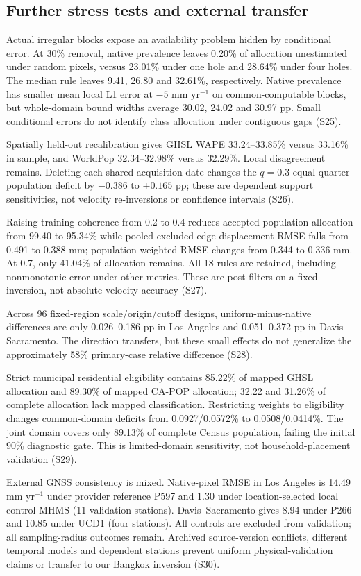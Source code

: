 \subsection{Further stress tests and external transfer}
Actual irregular blocks expose an availability problem hidden by conditional error. At 30\% removal, native prevalence leaves 0.20\% of allocation unestimated under random pixels, versus 23.01\% under one hole and 28.64\% under four holes. The median rule leaves 9.41, 26.80 and 32.61\%, respectively. Native prevalence has smaller mean local L1 error at $-5$ mm yr$^{-1}$ on common-computable blocks, but whole-domain bound widths average 30.02, 24.02 and 30.97 pp. Small conditional errors do not identify class allocation under contiguous gaps (S25).

Spatially held-out recalibration gives GHSL WAPE 33.24--33.85\% versus 33.16\% in sample, and WorldPop 32.34--32.98\% versus 32.29\%. Local disagreement remains. Deleting each shared acquisition date changes the $q=0.3$ equal-quarter population deficit by $-0.386$ to $+0.165$ pp; these are dependent support sensitivities, not velocity re-inversions or confidence intervals (S26).

Raising training coherence from 0.2 to 0.4 reduces accepted population allocation from 99.40 to 95.34\% while pooled excluded-edge displacement RMSE falls from 0.491 to 0.388 mm; population-weighted RMSE changes from 0.344 to 0.336 mm. At 0.7, only 41.04\% of allocation remains. All 18 rules are retained, including nonmonotonic error under other metrics. These are post-filters on a fixed inversion, not absolute velocity accuracy (S27).

Across 96 fixed-region scale/origin/cutoff designs, uniform-minus-native differences are only 0.026--0.186 pp in Los Angeles and 0.051--0.372 pp in Davis--Sacramento. The direction transfers, but these small effects do not generalize the approximately 58\% primary-case relative difference (S28).

Strict municipal residential eligibility contains 85.22\% of mapped GHSL allocation and 89.30\% of mapped CA-POP allocation; 32.22 and 31.26\% of complete allocation lack mapped classification. Restricting weights to eligibility changes common-domain deficits from 0.0927/0.0572\% to 0.0508/0.0414\%. The joint domain covers only 89.13\% of complete Census population, failing the initial 90\% diagnostic gate. This is limited-domain sensitivity, not household-placement validation (S29).

External GNSS consistency is mixed. Native-pixel RMSE in Los Angeles is 14.49 mm yr$^{-1}$ under provider reference P597 and 1.30 under location-selected local control MHMS (11 validation stations). Davis--Sacramento gives 8.94 under P266 and 10.85 under UCD1 (four stations). All controls are excluded from validation; all sampling-radius outcomes remain. Archived source-version conflicts, different temporal models and dependent stations prevent uniform physical-validation claims or transfer to our Bangkok inversion (S30).
